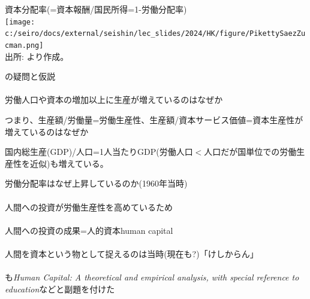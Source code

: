 \begin{frame}[label=KShare]{}
資本分配率(=資本報酬/国民所得=1-労働分配率)\\
\vspace{-0ex}
\hfil\texttt{[image: c:/seiro/docs/external/seishin/lec\_slides/2024/HK/figure/PikettySaezZucman.png]}\\
{\footnotesize 出所: \citet[][Table A49]{PikettySaezZucman2018}より作成。}
\end{frame}


\begin{frame}[label=Schultz]{}
\citet{Schultz1960}の疑問と仮説\\~\\
\pause
労働人口や資本の増加以上に生産が増えているのはなぜか
\pause
\begin{dinglist}{43}
\vspace{1.0ex}\setlength{\itemsep}{1.0ex}\setlength{\baselineskip}{12pt}
\item	つまり、生産額/労働量=労働生産性、生産額/資本サービス価値=資本生産性が増えているのはなぜか
	\begin{dinglist}{45}
	\vspace{1.0ex}\setlength{\itemsep}{1.0ex}\setlength{\baselineskip}{12pt}
	\item	国内総生産(GDP)/人口=1人当たりGDP(労働人口$<$人口だが国単位での労働生産性を近似)も増えている。
	\end{dinglist}
\end{dinglist}
\pause
\vspace{2ex}
労働分配率はなぜ上昇しているのか(1960年当時)\hfill\hyperlink{LShare<1>}{}
\\~\\
\pause
人間への投資が労働生産性を高めているため\\~\\
\pause
人間への投資の成果=人的資本human capital\\~\\
\pause
人間を資本という物として捉えるのは当時(現在も?)「けしからん」\\~\\
\pause
\citet{Becker1964}も\textit{Human Capital: A theoretical and empirical analysis, with special reference to education}などと副題を付けた
\end{frame}


